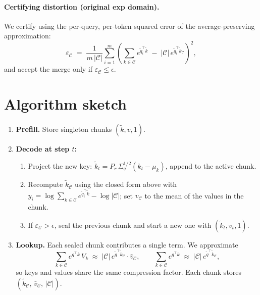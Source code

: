 \documentclass[11pt]{article}
\begin{document}
\paragraph{Certifying distortion (original exp domain).}
We certify using the per-query, per-token squared error of the average-preserving approximation:
\[
\varepsilon_\mathcal{C} \;=\; \frac{1}{m\,|\mathcal{C}|}\sum_{i=1}^m 
\left(\sum_{k\in\mathcal{C}} e^{\tilde q_i^\top \tilde k}
\;-\; |\mathcal{C}|\, e^{\tilde q_i^\top \tilde k_\mathcal{C}}\right)^{\!2},
\]
and accept the merge only if $\varepsilon_\mathcal{C}\le\epsilon$.

\section*{Algorithm sketch}
\begin{enumerate}
  \item \textbf{Prefill.} Store singleton chunks $(\tilde k, v, 1)$.
  \item \textbf{Decode at step $t$:}
  \begin{enumerate}[label*=\arabic*.]
    \item Project the new key: $\tilde k_t \!=\! P_r\,\Sigma_q^{1/2}(k_t-\mu_k)$, append to the active chunk.
    \item Recompute $\tilde k_\mathcal{C}$ using the closed form above with
          $y_i=\log\!\sum_{k\in\mathcal{C}} e^{\tilde q_i^\top \tilde k}-\log|\mathcal C|$;
          set $v_\mathcal{C}$ to the mean of the values in the chunk.
    \item If $\varepsilon_\mathcal{C}>\epsilon$, seal the previous chunk and start a new one with $(\tilde k_t,v_t,1)$.
  \end{enumerate}
  \item \textbf{Lookup.} Each sealed chunk contributes a single term. We approximate
  \[
  \sum_{k\in\mathcal{C}} e^{q^\top k}\,V_k 
  \;\approx\;
  |\mathcal C|\,e^{\tilde q^\top \tilde k_\mathcal{C}}\cdot \bar v_\mathcal{C},
  \qquad
  \sum_{k\in\mathcal{C}} e^{q^\top k}
  \;\approx\;
  |\mathcal C|\,e^{\tilde q^\top \tilde k_\mathcal{C}},
  \]
  so keys and values share the same compression factor. Each chunk stores $(\tilde k_\mathcal{C},\,\bar v_\mathcal{C},\,|\mathcal{C}|)$.
\end{enumerate}
\end{document}
